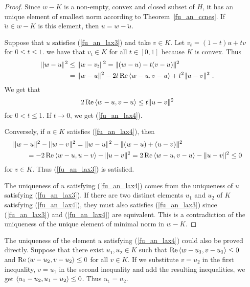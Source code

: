 \begin{proof}
Since $w-K$ is a non-empty, convex and closed subset of $H$, it has an
unique element of smallest norm according to
Theorem~\ref{fu_an_ccnes}.  If $\breve{u} \in w-K$ is this element, then
$u= w - \breve{u}$.

Suppose that $u$ satisfies (\ref{fu_an_lax3}) and take $v \in K$.  Let
$\displaystyle v_t = (1-t)u+t v$ for $0\leq t \leq 1$.  we have that
$v_t \in K$ for all $t \in [0,1]$ because $K$ is convex.  Thus
\begin{align*}
\| w-u\|^2 &\leq \| w - v_t\|^2 = \|(w-u) -t(v-u)\|^2 \\
&= \|w-u\|^2 - 2t \operatorname{Re} \left\langle{w-u} , {v-u}\right\rangle + t^2 \|u-v\|^2 \ .
\end{align*}
We get that
\[
2\operatorname{Re} \left\langle{w-u} , {v-u}\right\rangle \leq t \|u-v\|^2
\]
for $0<t \leq 1$.  If $t\rightarrow 0$, we get (\ref{fu_an_lax4}).

Conversely, if $u\in K$ satisfies (\ref{fu_an_lax4}), then
\begin{align*}
&\|w-u\|^2 - \|w-v\|^2
= \|w-u\|^2 - \|(w-u) + (u-v)\|^2 \\
&\qquad = -2 \operatorname{Re} \left\langle{w-u} , {u-v}\right\rangle  - \|u-v\|^2
= 2 \operatorname{Re} \left\langle{w-u} , {v-u}\right\rangle - \|u-v\|^2\leq 0
\end{align*}
for $v\in K$.  Thus (\ref{fu_an_lax3}) is satisfied.

The uniqueness of $u$ satisfying (\ref{fu_an_lax4}) comes from the
uniqueness of $u$ satisfying (\ref{fu_an_lax3}).  If there are two
distinct elements $u_1$ and $u_2$ of $K$ satisfying
(\ref{fu_an_lax4}), they must also satisfies (\ref{fu_an_lax3}) since
(\ref{fu_an_lax3}) and (\ref{fu_an_lax4}) are equivalent.  This is a
contradiction of the uniqueness of the unique element of minimal norm
in $w - K$.
\end{proof}

\begin{rmk}
The uniqueness of the element $u$ satisfying (\ref{fu_an_lax4}) could
also be proved directly.  Suppose that there exist $u_1, u_2 \in K$
such that
$\displaystyle \operatorname{Re} \left\langle{w-u_1} , {v-u_1}\right\rangle \leq 0$
and $\displaystyle \operatorname{Re} \left\langle{w-u_2} , {v-u_2}\right\rangle \leq 0$ for all $v \in K$.
If we substitute $v=u_2$ in the first inequality, $v=u_1$ in the
second inequality and add the resulting inequalities, we get
$\displaystyle \left\langle{u_1-u_2} , {u_1-u_2}\right\rangle \leq 0$.  Thus $u_1=u_2$.
\end{rmk}

